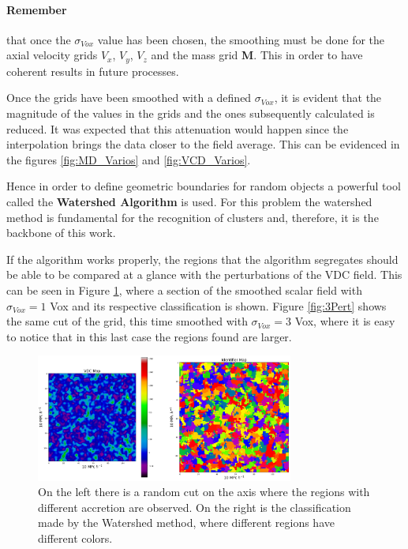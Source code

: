 \documentclass[a4paper,fleqn,usenatbib]{mnras}
\begin{document}
\paragraph{Remember}  that once the $\sigma_{Vox}$ value has been chosen, the smoothing must be done for the axial velocity grids $V_x$, $V_y$, $V_z$ and the mass grid \textbf{M}. This in order to have coherent results in future processes.




Once the grids have been smoothed with a defined $\sigma_{Vox}$, it is evident that the magnitude of the values in the grids and the ones subsequently calculated is reduced. It was expected that this attenuation would happen since the interpolation brings the data closer to the field average. This can be evidenced in the figures \ref{fig:MD_Varios} and \ref{fig:VCD_Varios}.


 Hence in order to define geometric boundaries for random objects a powerful tool called  the \textbf{Watershed Algorithm} is used. For this problem the watershed method is fundamental for the recognition of clusters and, therefore, it is the backbone of this work.
 
 If the algorithm works properly, the regions that the algorithm segregates should be able to be compared at a glance with the perturbations of the VDC field. This can be seen in Figure \ref{fig:1Pert}, where a section of the smoothed scalar field with $\sigma_{Vox} = 1$ Vox and its respective classification is shown. Figure \ref{fig:3Pert} shows the same cut of the grid, this time smoothed with $\sigma_{Vox} = 3$ Vox, where it is easy to notice that in this last case the regions found are larger.

\begin{figure}
    \centering
    \includegraphics[width=240pt]{1PlotPert_48.png}
    \caption{On the left there is a random cut on the axis where the regions with different accretion are observed. On the right is the classification made by the Watershed method, where different regions have different colors.}
    \label{fig:1Pert}
\end{figure}
\end{document}
